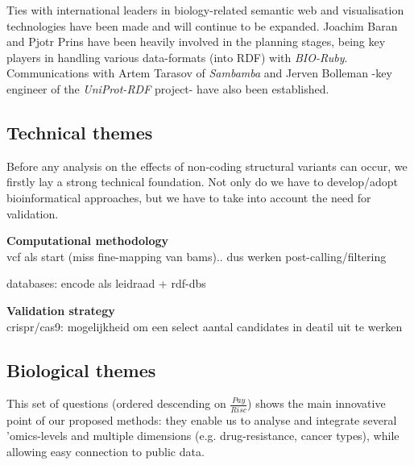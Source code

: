 \documentclass[twoside,fontsize=12pt]{article}
\begin{document}
Ties with international leaders in biology-related semantic web and visualisation technologies have been made and will continue to be expanded. Joachim Baran and Pjotr Prins have been heavily involved in the planning stages, being key players in handling various data-formats (into RDF) with \textit{BIO-Ruby}. Communications with Artem Tarasov of \textit{Sambamba} and Jerven Bolleman -key engineer of the \textit{UniProt-RDF} project- have also been established.
%	
%
%
%



\subsection*{Technical themes}
Before any analysis on the effects of non-coding structural variants can occur, we firstly lay a strong technical foundation. Not only do we have to develop/adopt bioinformatical approaches, but we have to take into account the need for validation.
\medskip

\noindent
\textbf{Computational methodology} \\
vcf als start (miss fine-mapping van bams).. dus werken post-calling/filtering

databases: encode als leidraad + rdf-dbs
\medskip

\noindent
\textbf{Validation strategy} \\
crispr/cas9: mogelijkheid om een select aantal candidates in deatil uit te werken


\subsection*{Biological themes}
This set of questions (ordered descending on $\frac{Pay}{Risc}$) shows the main innovative point of our proposed methods: they enable us to analyse and integrate several 'omics-levels and multiple dimensions (e.g. drug-resistance, cancer types), while allowing easy connection to public data. 
\medskip
\end{document}
